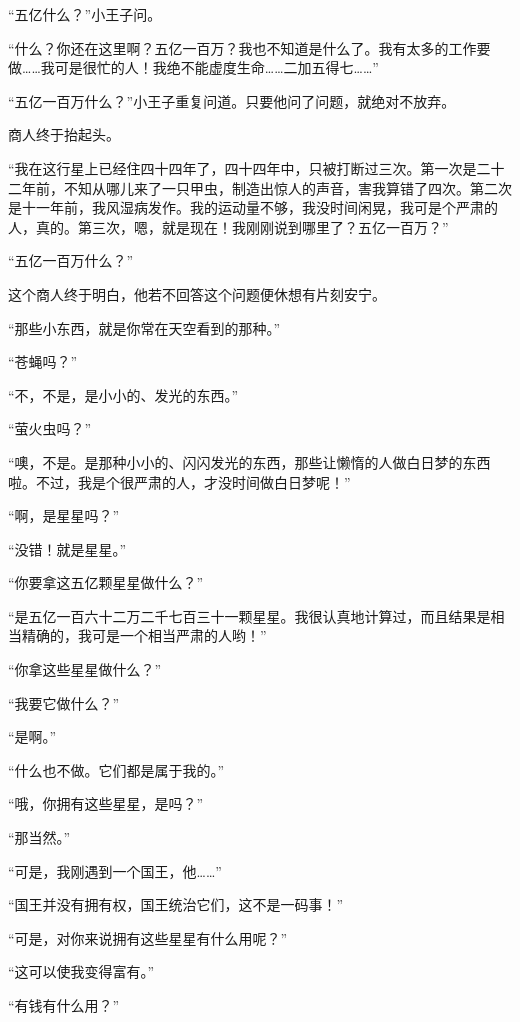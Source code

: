 “五亿什么？”小王子问。

“什么？你还在这里啊？五亿一百万？我也不知道是什么了。我有太多的工作要做\ldots{}\ldots{}我可是很忙的人！我绝不能虚度生命\ldots{}\ldots{}二加五得七\ldots{}\ldots{}”

“五亿一百万什么？”小王子重复问道。只要他问了问题，就绝对不放弃。

商人终于抬起头。

{\startalignment[center]
 \stopalignment}

“我在这行星上已经住四十四年了，四十四年中，只被打断过三次。第一次是二十二年前，不知从哪儿来了一只甲虫，制造出惊人的声音，害我算错了四次。第二次是十一年前，我风湿病发作。我的运动量不够，我没时间闲晃，我可是个严肃的人，真的。第三次，嗯，就是现在！我刚刚说到哪里了？五亿一百万？”

“五亿一百万什么？”

这个商人终于明白，他若不回答这个问题便休想有片刻安宁。

“那些小东西，就是你常在天空看到的那种。”

“苍蝇吗？”

“不，不是，是小小的、发光的东西。”

“萤火虫吗？”

“噢，不是。是那种小小的、闪闪发光的东西，那些让懒惰的人做白日梦的东西啦。不过，我是个很严肃的人，才没时间做白日梦呢！”

“啊，是星星吗？”

“没错！就是星星。”

“你要拿这五亿颗星星做什么？”

“是五亿一百六十二万二千七百三十一颗星星。我很认真地计算过，而且结果是相当精确的，我可是一个相当严肃的人哟！”

“你拿这些星星做什么？”

“我要它做什么？”

“是啊。”

“什么也不做。它们都是属于我的。”

“哦，你拥有这些星星，是吗？”

“那当然。”

“可是，我刚遇到一个国王，他\ldots{}\ldots{}”

“国王并没有拥有权，国王统治它们，这不是一码事！”

“可是，对你来说拥有这些星星有什么用呢？”

“这可以使我变得富有。”

“有钱有什么用？”


